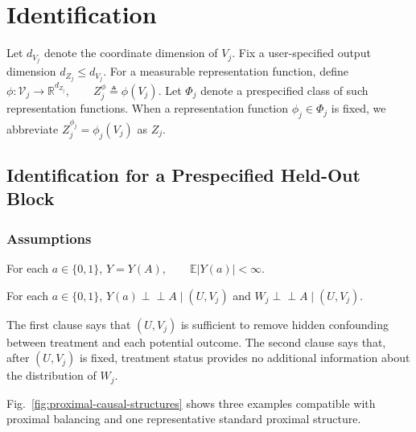 \section{Identification}
\label{app:identification-details}

Let $d_{V_j}$ denote the coordinate dimension of $V_j$. Fix a user-specified output dimension $d_{Z_j}\le d_{V_j}$. For a measurable representation function, define
	\(\phi:\mathcal V_j\longrightarrow\mathbb R^{d_{Z_j}}, \qquad Z_j^\phi\triangleq\phi(V_j).\)
Let $\Phi_j$ denote a prespecified class of such representation functions.
When a representation function $\phi_j\in\Phi_j$ is fixed, we abbreviate $Z_j^{\phi_j}=\phi_j(V_j)$ as $Z_j$.

\subsection{Identification for a Prespecified Held-Out Block} \label{sec:fixed-held-out-block-identification}

\subsubsection{Assumptions} \label{sec:identification-assumptions}

\begin{assumption}
	\label{appdetail:ass:consistency}
	For each $a\in\{0,1\}$,
	\(Y=Y(A), \qquad \mathbb E|Y(a)|<\infty.\)
\end{assumption}

\begin{assumption} \label{appdetail:ass:joint-latent-exchangeability} \label{appdetail:ass:held-out-separation}
	For each $a\in\{0,1\}$,
	\(Y(a)\perp\!\!\!\perp A\mid(U,V_j)\) and \(W_j\perp\!\!\!\perp A\mid(U,V_j).\)
\end{assumption}

The first clause says that $(U,V_j)$ is sufficient to remove hidden confounding between treatment and each potential outcome.
The second clause says that, after $(U,V_j)$ is fixed, treatment status provides no additional information about the distribution of $W_j$.

Fig.~\ref{fig:proximal-causal-structures} shows three examples compatible with proximal balancing and one representative standard proximal structure.

